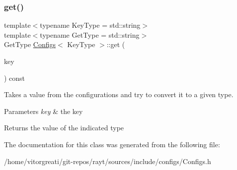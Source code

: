 \subsubsection{\texorpdfstring{get()}{get()}}
{\footnotesize\ttfamily template$<$typename Key\+Type = std\+::string$>$ \\
template$<$typename Get\+Type  = std\+::string$>$ \\
Get\+Type \mbox{\hyperlink{class_configs}{Configs}}$<$ Key\+Type $>$\+::get (\begin{DoxyParamCaption}\item[{const Key\+Type \&}]{key }\end{DoxyParamCaption}) const\hspace{0.3cm}{\ttfamily [inline]}}



Takes a value from the configurations and try to convert it to a given type. 


\begin{DoxyParams}{Parameters}
{\em key} & the key \\
\hline
\end{DoxyParams}
\begin{DoxyReturn}{Returns}
the value of the indicated type 
\end{DoxyReturn}


The documentation for this class was generated from the following file\+:\begin{DoxyCompactItemize}
\item 
/home/vitorgreati/git-\/repos/rayt/sources/include/configs/Configs.\+h\end{DoxyCompactItemize}
